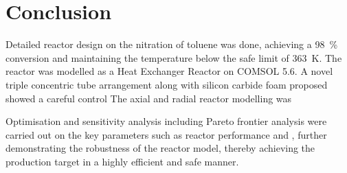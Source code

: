 \section{Conclusion} \label{sec:conclusion}
Detailed reactor design on the nitration of toluene was done, achieving a \SI{98}{\%} conversion and maintaining the temperature below the safe limit of \SI{363}{\K}. The reactor was modelled as a Heat Exchanger Reactor on COMSOL 5.6. A novel triple concentric tube arrangement along with silicon carbide foam proposed showed a careful control
The axial and radial reactor modelling was 

Optimisation and sensitivity analysis including Pareto frontier analysis were carried out on the key parameters such as reactor performance and , further demonstrating the robustness of the reactor model, thereby achieving the production target in a highly efficient and safe manner.  


